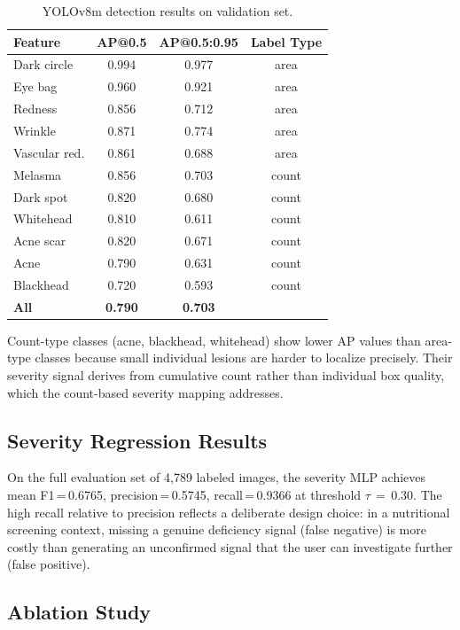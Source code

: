 \documentclass[journal]{IEEEtran}
\begin{document}
\begin{table}[h]
\centering
\caption{YOLOv8m detection results on validation set.}
\label{tab:detection}
\begin{tabular}{lccc}
\toprule
\textbf{Feature} & \textbf{AP@0.5} & \textbf{AP@0.5:0.95} & \textbf{Label Type}\\
\midrule
Dark circle      & 0.994 & 0.977 & area  \\
Eye bag          & 0.960 & 0.921 & area  \\
Redness          & 0.856 & 0.712 & area  \\
Wrinkle          & 0.871 & 0.774 & area  \\
Vascular red.    & 0.861 & 0.688 & area  \\
Melasma          & 0.856 & 0.703 & count \\
Dark spot        & 0.820 & 0.680 & count \\
Whitehead        & 0.810 & 0.611 & count \\
Acne scar        & 0.820 & 0.671 & count \\
Acne             & 0.790 & 0.631 & count \\
Blackhead        & 0.720 & 0.593 & count \\
\midrule
\textbf{All}     & \textbf{0.790} & \textbf{0.703} & \\
\bottomrule
\end{tabular}
\end{table}

Count-type classes (acne, blackhead, whitehead) show lower AP values than
area-type classes because small individual lesions are harder to localize
precisely. Their severity signal derives from cumulative count rather than
individual box quality, which the count-based severity mapping addresses.

\subsection{Severity Regression Results}

On the full evaluation set of 4{,}789 labeled images, the severity MLP achieves
mean F1\,=\,0.6765, precision\,=\,0.5745, recall\,=\,0.9366 at threshold
$\tau\,=\,0.30$. The high recall relative to precision reflects a deliberate
design choice: in a nutritional screening context, missing a genuine deficiency
signal (false negative) is more costly than generating an unconfirmed signal
that the user can investigate further (false positive).

\subsection{Ablation Study}
\label{sec:ablation}
\end{document}
